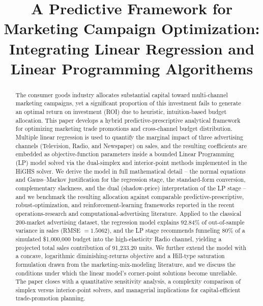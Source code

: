 \documentclass[conference]{IEEEtran}
\begin{document}
\title{A Predictive Framework for Marketing Campaign Optimization: Integrating Linear Regression and Linear Programming Algorithems}

\author{
}


\maketitle

\begin{abstract}
The consumer goods industry allocates substantial capital toward multi-channel marketing campaigns, yet a significant proportion of this investment fails to generate an optimal return on investment (ROI) due to heuristic, intuition-based budget allocation. This paper develops a hybrid predictive-prescriptive analytical framework for optimizing marketing trade promotions and cross-channel budget distribution. Multiple linear regression is used to quantify the marginal impact of three advertising channels (Television, Radio, and Newspaper) on sales, and the resulting coefficients are embedded as objective-function parameters inside a bounded Linear Programming (LP) model solved via the dual-simplex and interior-point methods implemented in the HiGHS solver. We derive the model in full mathematical detail -- the normal equations and Gauss--Markov justification for the regression stage, the standard-form conversion, complementary slackness, and the dual (shadow-price) interpretation of the LP stage -- and we benchmark the resulting allocation against comparable predictive-prescriptive, robust-optimization, and reinforcement-learning frameworks reported in the recent operations-research and computational-advertising literature. Applied to the classical 200-market advertising dataset, the regression model explains 92.84\% of out-of-sample variance in sales (RMSE $=1.5062$), and the LP stage recommends funneling 80\% of a simulated \$1{,}000{,}000 budget into the high-elasticity Radio channel, yielding a projected total sales contribution of 91{,}233.20 units. We further extend the model with a concave, logarithmic diminishing-returns objective and a Hill-type saturation formulation drawn from the marketing-mix-modeling literature, and we discuss the conditions under which the linear model's corner-point solutions become unreliable. The paper closes with a quantitative sensitivity analysis, a complexity comparison of simplex versus interior-point solvers, and managerial implications for capital-efficient trade-promotion planning.
\end{abstract}
\end{document}
